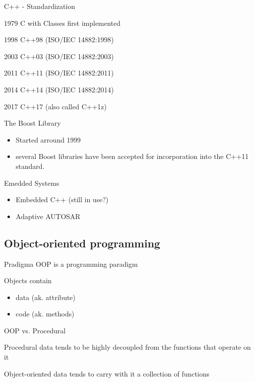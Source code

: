 \documentclass{beamer}
\begin{document}
\begin{frame}{C++ - Standardization}
\itemize{}
\item[1979] C with Classes first implemented 
\item[1998] C++98 (ISO/IEC 14882:1998)
\item[2003] C++03 (ISO/IEC 14882:2003)
\item[2011] C++11 (ISO/IEC 14882:2011)
\item[2014] C++14 (ISO/IEC 14882:2014)
\item[2017] C++17 (also called C++1z)
\end{frame}

\begin{frame}{The Boost Library}
\begin{itemize}
  \item Started arround 1999
  \item several Boost libraries have been accepted for incorporation into the
  C++11 standard.
\end{itemize}
\end{frame}

\begin{frame}{Emedded Systems}
\begin{itemize}
  \item Embedded C++ (still in use?)
  \item Adaptive AUTOSAR
\end{itemize}
\end{frame}


\subsection{Object-oriented programming}

\begin{frame}{Pradigma}
OOP is a programming paradigm
\begin{block}{Objects contain}
\begin{itemize}
\item data (ak. attribute)
\item code (ak. methods)
\end{itemize}
\end{block}
\end{frame}

\begin{frame}{OOP vs. Procedural}

\begin{block}{Procedural}
data tends to be highly decoupled from the functions that operate on it
\end{block}

\begin{block}{Object-oriented}
data tends to carry with it a collection of functions
\end{block}

\end{frame}
\end{document}
